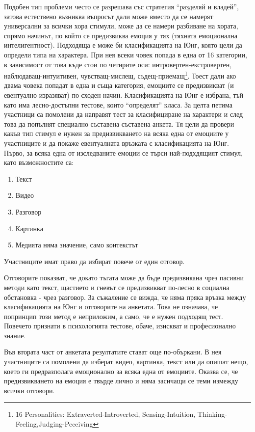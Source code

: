\documentclass[main.tex]{subfiles}
\begin{document}
Подобен тип проблеми често се разрешава със стратегия ``разделяй и владей'', затова естествено възниква въпросът дали може вместо да се намерят универсални за всички хора стимули, може да се намери разбиване на хората, спрямо начинът, по който се предизвиква емоция у тях (тяхната емоционална интелигентност). Подходяща е може би класификацията на Юнг, която цели да определи типа на характера. При нея всеки човек попада в една от 16 категории, в зависимост от това къде стои по четирите оси: интровертен-екстровертен, наблюдаващ-интуитивен,  чувстващ-мислещ, съдещ-приемащ\footnote{16 Personalities: Extraverted-Introverted, Sensing-Intuition, Thinking-Feeling,Judging-Peceiving}. Тоест дали ако двама човека попадат в една и съща категория, емоциите се предизвикват (и евентуално изразяват) по сходен начин. Класификацията на Юнг е избрана, тъй като има лесно-достъпни тестове, които ``определят'' класа. 
За целта петима участници са помолени да направят тест за класифициране на характери и след това да попълнят специално съставена съставена анкета. Тя цели да провери какъв тип стимул е нужен за предизвикването на всяка една от емоциите у участниците и да покаже евентуалната връзката с класификацията на Юнг.
Първо, за всяка една от изследваните емоции се търси най-подхдящият стимул, като възможностите са:
\begin{enumerate}
    \item Текст
    \item Видео
    \item Разговор
    \item Картинка
    \item Медията няма значение, само контекстът
\end{enumerate}
Участниците имат право да избират повече от един отговор.

Отговорите показват, че докато тъгата може да бъде предизвикана чрез пасивни методи като текст, щастието и гневът се предизвикват по-лесно в социална обстановка - чрез разговор. За съжаление се вижда, че няма пряка връзка между класификацията на Юнг и отговорите на анкетата. Това не означава, че попринцип този метод е неприложим, а само, че е нужен подходящ тест. Повечето признати в психологията тестове, обаче, изискват и професионално знание. 

Във втората част от анкетата резултатите стават още по-объркани. В нея участниците са помолени да изберат видео, картинка, текст или да опишат нещо, което ги предразполага емоционално за всяка една от емоциите. Оказва се, че предизвикването на емоция е твърде лично и няма засичащи се теми измежду всички отговори.
\end{document}
